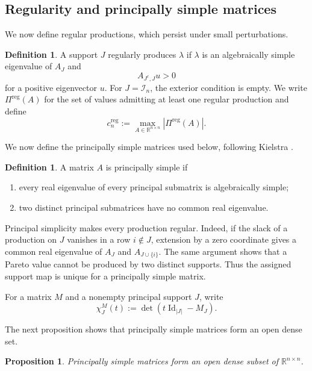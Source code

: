 \documentclass[11pt,a4paper]{article}
\newtheorem{proposition}[theorem]{Proposition}
\theoremstyle{definition}
\newtheorem{definition}[theorem]{Definition}
\newcommand{\R}{\mathbb R}
\newcommand{\Ind}{\mathcal I}
\newcommand{\Id}{\operatorname{Id}}
\begin{document}
\subsection{Regularity and principally simple matrices}

We now define regular productions, which persist under small
perturbations.

\begin{definition}
A support $J$ regularly produces $\lambda$ if $\lambda$ is an
algebraically simple eigenvalue of $A_J$ and
$$
A_{J^{\mathrm c},J}u>0
$$
for a positive eigenvector $u$. For $J=\Ind_n$, the exterior condition is
empty. We write $\Pi^{\mathrm{reg}}(A)$ for the set of values admitting
at least one regular production and define
$$
c_n^{\mathrm{reg}}
:=
\max_{A\in\R^{n\times n}}
|\Pi^{\mathrm{reg}}(A)|.
$$
\end{definition}

We now define the principally simple matrices used below, following
Kielstra \cite[Definition~3.5.1]{Kielstra2023}.

\begin{definition}
\label{def:principally-simple}
A matrix $A$ is principally simple if

\begin{enumerate}[label=\textup{(\roman*)}]
\item every real eigenvalue of every principal submatrix is
algebraically simple;
\item two distinct principal submatrices have no common real
eigenvalue.
\end{enumerate}
\end{definition}

Principal simplicity makes every production regular. Indeed, if the
slack of a production on $J$ vanishes in a row $i\notin J$, extension
by a zero coordinate gives a common real eigenvalue of $A_J$ and
$A_{J\cup\{i\}}$. The same argument shows that a Pareto value cannot
be produced by two distinct supports. Thus the assigned support map is
unique for a principally simple matrix.

For a matrix $M$ and a nonempty principal support $J$, write
$$
\chi_J^M(t):=\det(t\Id_{|J|}-M_J).
$$

The next proposition shows that principally simple matrices form an
open dense set.

\begin{proposition}
\label{prop:principal-density}
Principally simple matrices form an open dense subset of
$\R^{n\times n}$.
\end{proposition}
\end{document}
